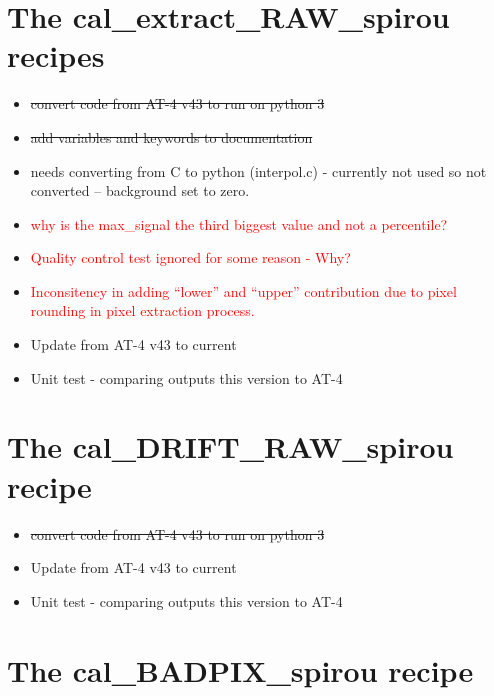 \section{The cal\_extract\_RAW\_spirou recipes}
\label{ch:todo:cal_extract_RAW_spirou}

\begin{itemize}
	\item \sout{convert code from AT-4 v43 to run on python 3}
	\item \sout{add variables and keywords to documentation}
	\item {} needs converting from C to python (interpol.c) - currently not used so not converted -- background set to zero.
	\item \textcolor{red}{ why is the max\_signal the third biggest value and not a percentile?}
	\item \textcolor{red}{Quality control test  ignored for some reason - Why?}
	\item \textcolor{red}{Inconsitency in adding ``lower'' and ``upper'' contribution due to pixel rounding in pixel extraction process.}
	\item Update from AT-4 v43 to current
	\item Unit test - comparing outputs this version to AT-4
\end{itemize}

\section{The cal\_DRIFT\_RAW\_spirou recipe}
\label{ch:todo:cal_DRIFT_RAW_spirou}

\begin{itemize}
	\item \sout{convert code from AT-4 v43 to run on python 3}
	\item Update from AT-4 v43 to current
	\item Unit test - comparing outputs this version to AT-4
\end{itemize}


\section{The cal\_BADPIX\_spirou recipe}
\label{ch:todo:cal_BADPIX_spirou}

